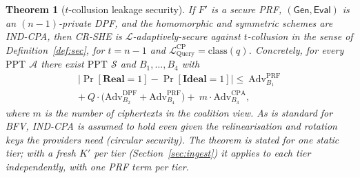 \documentclass[a4paper,fleqn]{cas-sc}
\newtheorem{theorem}{Theorem}
\newcommand{\PPT}{\mathrm{PPT}}
\newcommand{\Real}{\mathbf{Real}}
\newcommand{\Ideal}{\mathbf{Ideal}}
\newcommand{\Leak}{\mathcal{L}}
\newcommand{\Sim}{\mathcal{S}}
\newcommand{\Adv}{\mathcal{A}}
\newcommand{\Gen}{\mathsf{Gen}}
\newcommand{\Eval}{\mathsf{Eval}}
\begin{document}
\begin{theorem}[$t$-collusion leakage security]
\label{thm:sec}
If $F'$ is a secure PRF, $(\Gen,\Eval)$ is an $(n{-}1)$-private DPF, and the
homomorphic and symmetric schemes are IND-CPA, then CR-SHE is
$\Leak$-adaptively-secure against $t$-collusion in the sense of
Definition~\ref{def:sec}, for $t=n-1$ and
$\Leak^{\text{CP}}_{\mathrm{Query}}=\mathrm{class}(q)$. Concretely, for every
$\PPT$ $\Adv$ there exist $\PPT$ $\Sim$ and $B_1,\dots,B_4$ with
\begin{multline*}
\big|\Pr[\Real{=}1]-\Pr[\Ideal{=}1]\big|
\le\ \mathrm{Adv}^{\mathrm{PRF}}_{B_1}\\
+\ Q\cdot\big(\mathrm{Adv}^{\mathrm{DPF}}_{B_2}
+\mathrm{Adv}^{\mathrm{PRF}}_{B_4}\big)
+\ m\cdot\mathrm{Adv}^{\mathrm{CPA}}_{B_3},
\end{multline*}
where $m$ is the number of ciphertexts in the coalition view. As is standard
for BFV, IND-CPA is assumed to hold even given the relinearisation and
rotation keys the providers need (circular security). The theorem is stated
for one static tier; with a fresh $K'$ per tier
(Section~\ref{sec:ingest}) it applies to each tier independently, with one PRF
term per tier.
\end{theorem}
\end{document}
